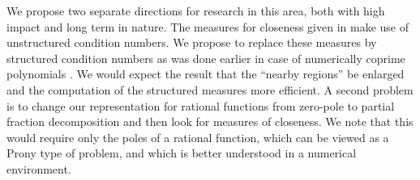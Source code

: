 We propose two separate directions for research in this area, both with high impact and long term in nature. The measures for closeness given in \cite{matos} make use of unstructured 
condition numbers. We propose to replace these measures by structured condition numbers as was done earlier in case of numerically coprime polynomials \cite{coprime}. We would expect the result that the ``nearby regions''  be enlarged and the computation of the structured measures more efficient. A second problem is to change our representation for rational functions from zero-pole to partial fraction decomposition and then look for measures of closeness. We note that this would require only the poles of a rational function, which can be viewed as a Prony type of problem, and which is better understood in a numerical environment.




